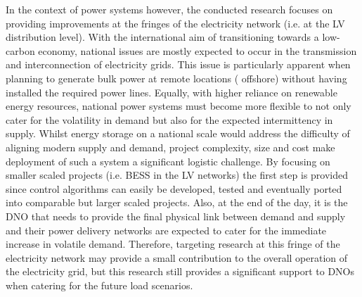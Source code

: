 In the context of power systems however, the conducted research focuses on providing improvements at the fringes of the electricity network (i.e. at the LV distribution level).
With the international aim of transitioning towards a low-carbon economy, national issues are mostly expected to occur in the transmission and interconnection of electricity grids.
This issue is particularly apparent when planning to generate bulk power at remote locations ( offshore) without having installed the required power lines.
Equally, with higher reliance on renewable energy resources, national power systems must become more flexible to not only cater for the volatility in demand but also for the expected intermittency in supply.
Whilst energy storage on a national scale would address the difficulty of aligning modern supply and demand, project complexity, size and cost make deployment of such a system a significant logistic challenge.
By focusing on smaller scaled projects (i.e. BESS in the LV networks) the first step is provided since control algorithms can easily be developed, tested and eventually ported into comparable but larger scaled projects.
Also, at the end of the day, it is the DNO that needs to provide the final physical link between demand and supply and their power delivery networks are expected to cater for the immediate increase in volatile demand.
Therefore, targeting research at this fringe of the electricity network may provide a small contribution to the overall operation of the electricity grid, but this research still provides a significant support to DNOs when catering for the future load scenarios.
